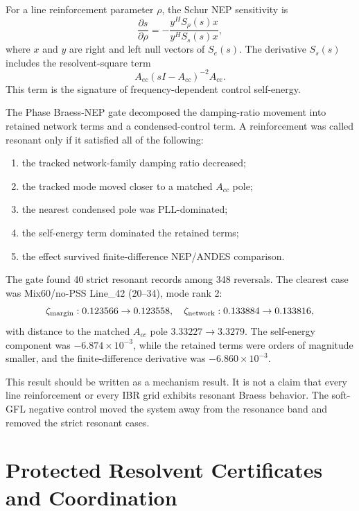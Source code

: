 \documentclass[11pt]{article}
\begin{document}
For a line reinforcement parameter $\rho$, the Schur NEP sensitivity is
\begin{equation}
  \frac{\partial s}{\partial \rho}
  =
  -\frac{y^H S_\rho(s)x}{y^HS_s(s)x},
  \label{eq:schur-sensitivity}
\end{equation}
where $x$ and $y$ are right and left null vectors of $S_e(s)$. The derivative
$S_s(s)$ includes the resolvent-square term
\begin{equation}
  A_{ec}(sI-A_{cc})^{-2}A_{ce}.
  \label{eq:control-resolvent-square}
\end{equation}
This term is the signature of frequency-dependent control self-energy.

The Phase Braess-NEP gate decomposed the damping-ratio movement into retained
network terms and a condensed-control term. A reinforcement was called
resonant only if it satisfied all of the following:
\begin{enumerate}[leftmargin=*]
\item the tracked network-family damping ratio decreased;
\item the tracked mode moved closer to a matched $A_{cc}$ pole;
\item the nearest condensed pole was PLL-dominated;
\item the self-energy term dominated the retained terms;
\item the effect survived finite-difference NEP/ANDES comparison.
\end{enumerate}
The gate found 40 strict resonant records among 348 reversals. The clearest
case was Mix60/no-PSS Line\_42 (20--34), mode rank 2:
\[
\zeta_{\rm margin}:0.123566\to0.123558,\quad
\zeta_{\rm network}:0.133884\to0.133816,
\]
with distance to the matched $A_{cc}$ pole $3.33227\to3.3279$. The self-energy
component was $-6.874\times10^{-3}$, while the retained terms were orders of
magnitude smaller, and the finite-difference derivative was
$-6.860\times10^{-3}$.

This result should be written as a mechanism result. It is not a claim that
every line reinforcement or every IBR grid exhibits resonant Braess behavior.
The soft-GFL negative control moved the system away from the resonance band and
removed the strict resonant cases.

\section{Protected Resolvent Certificates and Coordination}
\end{document}
